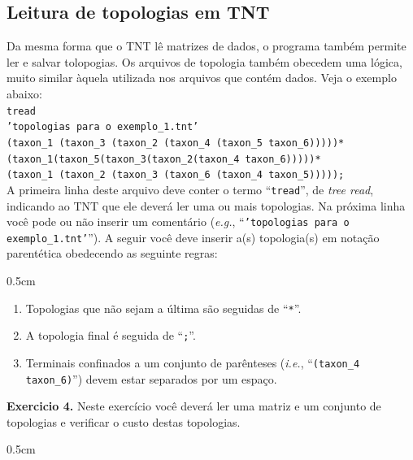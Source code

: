 \begin{refsection}
\section{Leitura de topologias em TNT}\label{tut4:tread}

Da mesma forma que o TNT lê matrizes de dados, o programa também permite ler e salvar tolopogias. Os arquivos de topologia também obecedem uma lógica, muito similar àquela utilizada nos arquivos que contém dados. Veja o exemplo abaixo:\\

\indent\indent\texttt{tread}\\
\indent\indent\texttt{'topologias para o exemplo\_1.tnt'}\\
\indent\indent\texttt{(taxon\_1 (taxon\_3 (taxon\_2 (taxon\_4 (taxon\_5 taxon\_6)))))* }\\
\indent\indent\texttt{(taxon\_1(taxon\_5(taxon\_3(taxon\_2(taxon\_4 taxon\_6)))))* }\\
\indent\indent\texttt{(taxon\_1 (taxon\_2 (taxon\_3 (taxon\_6 (taxon\_4 taxon\_5)))));}\\

A primeira linha deste arquivo deve conter o termo ``\texttt{tread}'', de \textit{tree read}, indicando ao TNT que ele deverá ler uma ou mais topologias. Na próxima linha você pode ou não inserir um comentário (\textit{e.g.}, ``\texttt{'topologias para o exemplo\_1.tnt'}''). A seguir você deve inserir a(s) topologia(s) em notação parentética obedecendo as seguinte regras:

\begin {myindentpar}{0.5cm}
\begin{enumerate}[\itshape a.]
	\item{Topologias que não sejam a última são seguidas de ``\texttt{*}''.}
	\item{A topologia final é seguida de ``\texttt{;}''.}
	\item{Terminais confinados a um conjunto de parênteses (\textit{i.e.}, ``\texttt{(taxon\_4 taxon\_6)}'') devem estar separados por um espaço.}
\end{enumerate}
\end{myindentpar}

\begin{blackBlock}{\textbf{Exercicio 4.}}\label{tut4:ex:4.3}
	Neste exercício você deverá ler uma matriz e um conjunto de topologias e verificar o custo destas topologias.

\begin {myindentpar}{0.5cm}
\begin{enumerate}[\itshape a.]


\end{enumerate}
\end{myindentpar}
\end{blackBlock}
\end{refsection}
